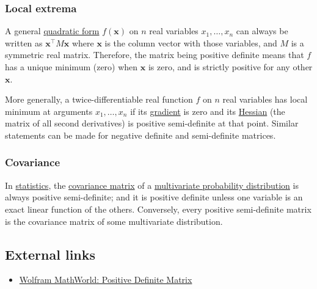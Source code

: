 \hypertarget{local-extrema}{%
\subsubsection{Local extrema}\label{local-extrema}}

A general \href{quadratic_form}{quadratic form} \(f(\mathbf{x})\) on
\(n\) real variables \(x_1, \ldots, x_n\) can always be written as
\(\mathbf{x}^\top  M \mathbf{x}\) where \(\mathbf{x}\) is the
column vector with those variables, and \(M\) is a symmetric real
matrix. Therefore, the matrix being positive definite means that \(f\)
has a unique minimum (zero) when \(\mathbf{x}\) is zero, and is strictly
positive for any other \(\mathbf{x}\).

More generally, a twice-differentiable real function \(f\) on \(n\) real
variables has local minimum at arguments \(x_1, \ldots, x_n\) if its
\url{gradient} is zero and its \href{Hessian_matrix}{Hessian} (the
matrix of all second derivatives) is positive semi-definite at that
point. Similar statements can be made for negative definite and
semi-definite matrices.

\hypertarget{covariance}{%
\subsubsection{Covariance}\label{covariance}}

In \url{statistics}, the \href{covariance_matrix}{covariance matrix} of
a \href{multivariate_probability_distribution}{multivariate probability
distribution} is always positive semi-definite; and it is positive
definite unless one variable is an exact linear function of the others.
Conversely, every positive semi-definite matrix is the covariance matrix
of some multivariate distribution.




\hypertarget{external-links}{%
\subsection{External links}\label{external-links}}

\begin{itemize}
\item
  \href{http://mathworld.wolfram.com/PositiveDefiniteMatrix.html}{Wolfram
  MathWorld: Positive Definite Matrix}
\end{itemize}

%
%
%
